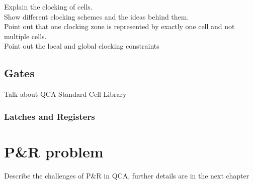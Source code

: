 Explain the clocking of cells. \\
Show different clocking schemes and the ideas behind them. \\
Point out that one clocking zone is represented by exactly one cell and not multiple cells. \\
Point out the local and global clocking constraints

\subsection{Gates}
Talk about QCA Standard Cell Library

\subsubsection{Latches and Registers}



\section{P\&R problem}

Describe the challenges of P\&R in QCA, further details are in the next chapter